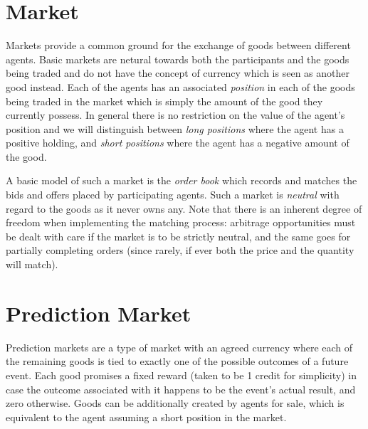 \documentclass[bsc,frontabs,twoside,singlespacing,parskip,deptreport]{infthesis}     %
\begin{document}
\section{Market}
	Markets provide a common ground for the exchange of goods between different agents. Basic markets are netural towards both the participants and the goods being traded and do not have the concept of currency which is seen as another good instead. Each of the agents has an associated {\em position} in each of the goods being traded in the market which is simply the amount of the good they currently possess. In general there is no restriction on the value of the agent's position and we will distinguish between {\em long positions} where the agent has a positive holding, and {\em short positions} where the agent has a negative amount of the good. 

	A basic model of such a market is the {\em order book} which records and matches the bids and offers placed by participating agents. Such a market is {\em neutral} with regard to the goods as it never owns any. Note that there is an inherent degree of freedom when implementing the matching process: arbitrage opportunities must be dealt with care if the market is to be strictly neutral, and the same goes for partially completing orders (since rarely, if ever both the price and the quantity will match). 

\section{Prediction Market}
	Prediction markets are a type of market with an agreed currency where each of the remaining goods is tied to exactly one of the possible outcomes of a future event. Each good promises a fixed reward (taken to be 1 credit for simplicity) in case the outcome associated with it happens to be the event's actual result, and zero otherwise. Goods can be additionally created by agents for sale, which is equivalent to the agent assuming a short position in the market. 
	
	
\end{document}
